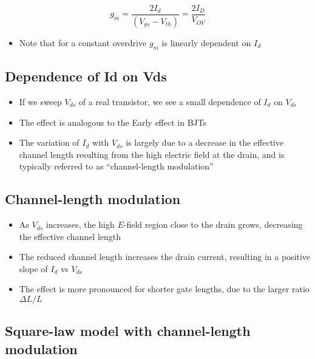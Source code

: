 \documentclass[11pt]{article}
\providecommand{\tightlist}{%
      \setlength{\itemsep}{0pt}\setlength{\parskip}{0pt}}
\begin{document}
\begin{equation}
g_m = \dfrac{2I_d}{(V_{gs} - V_{th})} = \dfrac{2I_D}{V_{OV}}
\end{equation}

\begin{itemize}
\tightlist
\item
  Note that for a constant overdrive \(g_m\) is linearly dependent on
  \(I_d\)
\end{itemize}

    \hypertarget{dependence-of-id-on-vds}{%
\subsection{Dependence of Id on Vds}\label{dependence-of-id-on-vds}}

    

    \begin{itemize}
\tightlist
\item
  If we sweep \(V_{ds}\) of a real transistor, we see a small dependence
  of \(I_d\) on \(V_{ds}\)
\item
  The effect is analogous to the Early effect in BJTs
\item
  The variation of \(I_d\) with \(V_{ds}\) is largely due to a decrease
  in the effective channel length resulting from the high electric field
  at the drain, and is typically referred to as ``channel-length
  modulation''
\end{itemize}

    \hypertarget{channel-length-modulation}{%
\subsection{Channel-length modulation}\label{channel-length-modulation}}

    

    \begin{itemize}
\tightlist
\item
  As \(V_{ds}\) increases, the high \(E\)-field region close to the
  drain grows, decreasing the effective channel length
\item
  The reduced channel length increases the drain current, resulting in a
  positive slope of \(I_d\) vs \(V_{ds}\)
\item
  The effect is more pronounced for shorter gate lengths, due to the
  larger ratio \(\Delta L / L\)
\end{itemize}

    \hypertarget{square-law-model-with-channel-length-modulation}{%
\subsection{Square-law model with channel-length
modulation}\label{square-law-model-with-channel-length-modulation}}
\end{document}
